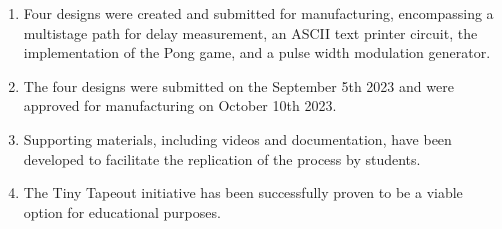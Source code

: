 \begin{enumerate}
    \item Four designs were created and submitted for manufacturing, encompassing a multistage path for delay measurement, an ASCII text printer circuit, the implementation of the Pong game, and a pulse width modulation generator.
    \item The four designs were submitted on the September 5th 2023 and were approved for manufacturing on October 10th 2023.
    \item Supporting materials, including videos and documentation, have been developed to facilitate the replication of the process by students.
    \item The Tiny Tapeout initiative has been successfully proven to be a viable option for educational purposes.
\end{enumerate}